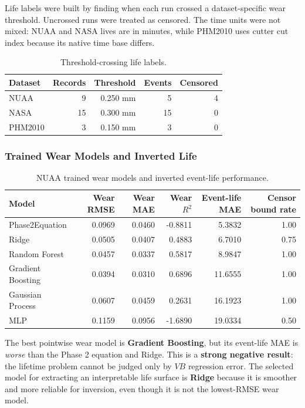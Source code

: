 \documentclass[11pt,a4paper]{article}
\newcommand{\vb}{V\!B}
\begin{document}
Life labels were built by finding when each run crossed a dataset-specific wear threshold. Uncrossed runs were treated as censored. The time units were not mixed: NUAA and NASA lives are in minutes, while PHM2010 uses cutter cut index because its native time base differs.

\begin{table}[!htbp]
  \centering
  \caption{Threshold-crossing life labels.}
  \label{tab:life-labels}
  \small
  \begin{tabular}{lrrrr}
    \toprule
    Dataset & Records & Threshold & Events & Censored \\
    \midrule
    NUAA & 9 & 0.250 mm & 5 & 4 \\
    NASA & 15 & 0.300 mm & 15 & 0 \\
    PHM2010 & 3 & 0.150 mm & 3 & 0 \\
    \bottomrule
  \end{tabular}
\end{table}

\subsubsection{Trained Wear Models and Inverted Life}

\begin{table}[!htbp]
  \centering
  \caption{NUAA trained wear models and inverted event-life performance.}
  \label{tab:wear-life-benchmark}
  \small
  \begin{tabular}{lrrrrr}
    \toprule
    Model & Wear RMSE & Wear MAE & Wear \(R^2\) & Event-life MAE & Censor bound rate \\
    \midrule
    Phase2Equation & 0.0969 & 0.0460 & -0.8811 & 5.3832 & 1.00 \\
    Ridge & 0.0505 & 0.0407 & 0.4883 & 6.7010 & 0.75 \\
    Random Forest & 0.0457 & 0.0337 & 0.5817 & 8.9847 & 1.00 \\
    Gradient Boosting & 0.0394 & 0.0310 & 0.6896 & 11.6555 & 1.00 \\
    Gaussian Process & 0.0607 & 0.0459 & 0.2631 & 16.1923 & 1.00 \\
    MLP & 0.1159 & 0.0956 & -1.6890 & 19.0334 & 0.50 \\
    \bottomrule
  \end{tabular}
\end{table}

The best pointwise wear model is \textbf{Gradient Boosting}, but its event-life MAE is \emph{worse} than the Phase 2 equation and Ridge. This is a \textbf{strong negative result}: the lifetime problem cannot be judged only by \(\vb\) regression error. The selected model for extracting an interpretable life surface is \textbf{Ridge} because it is smoother and more reliable for inversion, even though it is not the lowest-RMSE wear model.
\end{document}
